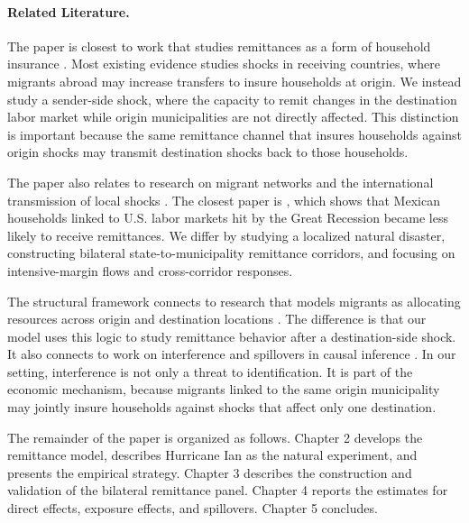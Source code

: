 \paragraph{Related Literature.} The paper is closest to work that studies remittances as a form of household insurance \parencite{yang_choi_2007, bettin_2023}. Most existing evidence studies shocks in receiving countries, where migrants abroad may increase transfers to insure households at origin. We instead study a sender-side shock, where the capacity to remit changes in the destination labor market while origin municipalities are not directly affected. This distinction is important because the same remittance channel that insures households against origin shocks may transmit destination shocks back to those households.

The paper also relates to research on migrant networks and the international transmission of local shocks \parencite{munshi2003, caballero_2023}. The closest paper is \textcite{caballero_2023}, which shows that Mexican households linked to U.S. labor markets hit by the Great Recession became less likely to receive remittances. We differ by studying a localized natural disaster, constructing bilateral state-to-municipality remittance corridors, and focusing on intensive-margin flows and cross-corridor responses.

The structural framework connects to research that models migrants as allocating resources across origin and destination locations \parencite{albert_monras_2022}. The difference is that our model uses this logic to study remittance behavior after a destination-side shock. It also connects to work on interference and spillovers in causal inference \parencite{hudgens2008, aronow2017, butts2023}. In our setting, interference is not only a threat to identification. It is part of the economic mechanism, because migrants linked to the same origin municipality may jointly insure households against shocks that affect only one destination.

The remainder of the paper is organized as follows. Chapter 2 develops the remittance model, describes Hurricane Ian as the natural experiment, and presents the empirical strategy. Chapter 3 describes the construction and validation of the bilateral remittance panel. Chapter 4 reports the estimates for direct effects, exposure effects, and spillovers. Chapter 5 concludes.
